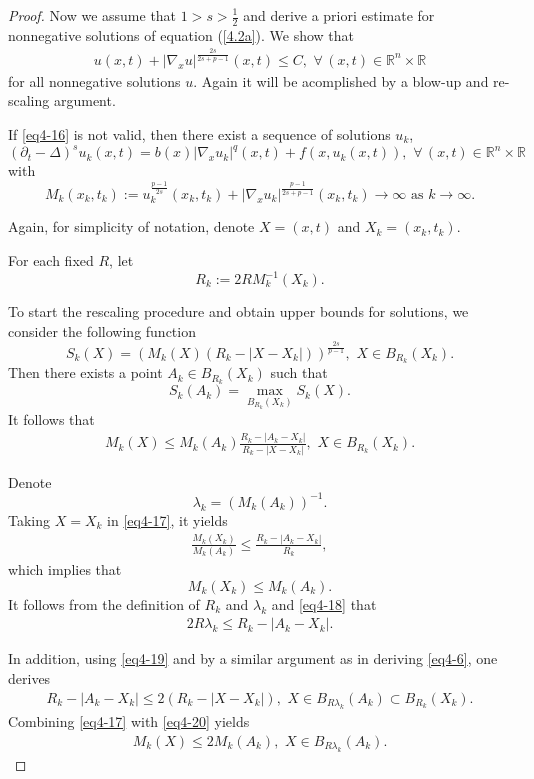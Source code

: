 \documentclass[12pt]{article}
\theoremstyle{remark}
\numberwithin{equation}{section}
\begin{document}
\begin{proof}
Now we assume that $1> s>\frac{1}{2}$ and derive a priori estimate for nonnegative solutions of equation (\ref{4.2a}).
We show that
\begin{eqnarray}\label{eq4-16}
u(x,t)+|\nabla_x u|^{\frac{2s}{2s+p-1}}(x,t)\leq C,\,\, \forall \, (x,t) \in \mathbb{R}^n \times \mathbb{R}
\end{eqnarray}
for all nonnegative solutions $u$. Again it will be acomplished by a blow-up and re-scaling argument.


If \eqref{eq4-16} is not valid, then there exist a sequence of solutions $u_k$,
$$
(\partial_t -\Delta)^s u_k(x,t)=b(x)|\nabla_x u_k|^q(x,t)+f(x, u_k(x,t)), \,\, \forall \, (x,t) \in \mathbb{R}^n \times \mathbb{R}
$$
with
$$
M_k(x_k, t_k):=u_k^{\frac{p-1}{2s}}(x_k, t_k)+|\nabla_x u_k|^{\frac{p-1}{2s+p-1}}(x_k, t_k) \to \infty\,\, \mbox{as} \,\, k\to \infty.
$$

Again, for simplicity of notation, denote $X =(x,t)$ and $X_k = (x_k, t_k)$.

For each fixed $R$, let
$$
R_k:=2 R M_k^{-1}(X_k).
$$


To start the rescaling procedure and  obtain upper bounds for solutions, we consider the following function
$$
 S_k(X)=\left(M_k(X)(R_k-|X-X_k|)\right)^\frac{2s}{p-1},\,\, X \in B_{R_k}(X_k).
$$
Then there exists a point $A_k \in B_{R_k}(X_k)$  such that
$$
S_k(A_k)=\mathop{\max}\limits_{B_{R_k}(X_k)} S_k(X).
$$
It follows that
\begin{eqnarray}\label{eq4-17}
M_k(X)\leq M_k(A_k)\frac{R_k-|A_k-X_k|}{R_k-|X-X_k|},\,\, X\in B_{R_k}(X_k).
\end{eqnarray}

Denote
$$
\lambda_k=(M_k(A_k))^{-1}.
$$
Taking $X=X_k$ in \eqref{eq4-17}, it yields
 \begin{eqnarray}\label{eq4-18}
\frac{M_k(X_k)}{M_k(A_k)}\leq \frac{R_k-|A_k-X_k|}{R_k},
\end{eqnarray}
which implies that
$$
M_k(X_k)\leq M_k(A_k).
$$
It follows from  the definition of $R_k$ and $\lambda_k$ and  \eqref{eq4-18} that
 \begin{eqnarray}\label{eq4-19}
2R\lambda_k\leq R_k-|A_k-X_k|.
\end{eqnarray}

In addition, using \eqref{eq4-19} and by a similar argument as in deriving \eqref{eq4-6}, one derives
\begin{eqnarray}\label{eq4-20}
R_k-|A_k-X_k|\leq 2(R_k-|X-X_k|),\,\, X\in B_{R \lambda_k}(A_k)\subset B_{R_k}(X_k).
\end{eqnarray}
Combining \eqref{eq4-17} with \eqref{eq4-20} yields
\begin{eqnarray}\label{eq4-21}
	M_k(X)\leq 2 M_k(A_k) ,  \,\, X\in B_{R\lambda_k}(A_k).
\end{eqnarray}


\end{proof}
\end{document}
